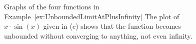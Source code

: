     \begin{figure}[htb]%
\centering
{}%
\hspace{5pt}%
%
\hspace{5pt}%
%
\hspace{5pt}%
%
    \caption[]{Graphs of the four functions in Example~\ref{ex:UnboundedLimitAtPlusInfinity} The plot of $x \cdot \sin(x)$ given in (c) shows that the function becomes unbounded without converging to anything, not even infinity.}
    \label{fig:LimitsAtInfinity}
\end{figure}

